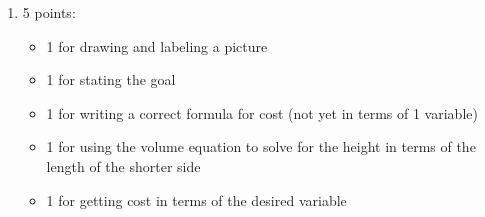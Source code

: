 \documentclass{article}
\begin{document}
\begin{enumerate}
\begin{enumerate}
    \begin{grading}
      2 points: 0.5 for finding the height, 1 for finding the cost of the sides, 0.5 for findign the cost of the bottom
    \end{grading}

    \begin{problem}[\vfill]
      If they decide to make the bottom of the box 1 ft $\times$ 2 ft, how much will the box cost? 
    \end{problem}

    \begin{solution}
      Let's draw a picture.
      

      Since the volume of the box must be 3 cubic feet, the height of the box would need to be 1.5 feet.
      This means that the cost of the bottom of the box would be $(70\text{ cents/ft}^2)(2\text{ ft})
      (1\text{ ft})=\$1.40$, and the cost of the sides of the box would be $(20\text{ cents/ft}^2)\bigl[
      2(2\text{ ft})(1.5 \text{ft}) + 2(1\text{ ft})(1.5 \text{ ft})\bigr]=\$1.80$. The total cost of the
      box would be $\$3.20$, or 320 cents.
    \end{solution}  

  \item \label{fall2018-premidterm-practice3-3-modified-function}

    \begin{grading}
      5 points:
      \begin{itemize}[nosep]
      \item 1 for drawing and labeling a picture
      \item 1 for stating the goal
      \item 1 for writing a correct formula for cost (not yet in terms of 1 variable)
      \item 1 for using the volume equation to solve for the height in terms of the length of the shorter side
      \item 1 for getting cost in terms of the desired variable
      \end{itemize}
    \end{grading}


\end{enumerate}
\end{enumerate}
\end{document}
